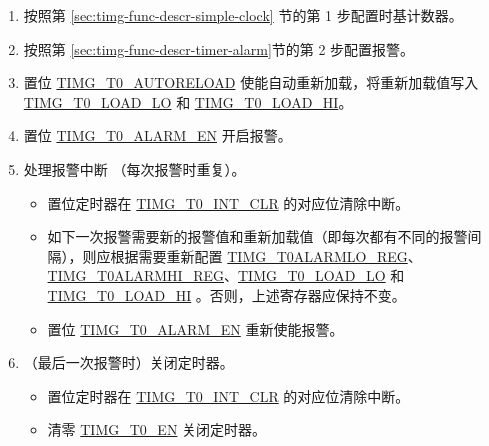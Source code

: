 \documentclass[main\_\_CN.tex]{subfiles}
\begin{document}
\begin{enumerate}
    \item 按照第 \ref{sec:timg-func-descr-simple-clock} 节的第 1 步配置时基计数器。
    \item 按照第 \ref{sec:timg-func-descr-timer-alarm}节的第 2 步配置报警。
    \item 置位 \hyperref[fielddesc:TIMGTXAUTORELOAD]{TIMG\_T0\_AUTORELOAD} 使能自动重新加载，将重新加载值写入 \hyperref[fielddesc:TIMGTXLOADLO]{TIMG\_T0\_LOAD\_LO} 和 \hyperref[fielddesc:TIMGTXLOADHI]{TIMG\_T0\_LOAD\_HI}。
    \item 置位 \hyperref[fielddesc:TIMGTXALARMEN]{TIMG\_T0\_ALARM\_EN} 开启报警。
    \item 处理报警中断 （每次报警时重复）。
    \begin{itemize}
        \item 置位定时器在 \hyperref[fielddesc:TIMGT0INTCLR]{TIMG\_T0\_INT\_CLR} 的对应位清除中断。
        \item 如下一次报警需要新的报警值和重新加载值（即每次都有不同的报警间隔），则应根据需要重新配置 \hyperref[regdesc:TIMGTXALARMLOREG]{TIMG\_T0ALARMLO\_REG}、\hyperref[regdesc:TIMGTXALARMHIREG]{TIMG\_T0ALARMHI\_REG}、\hyperref[fielddesc:TIMGTXLOADLO]{TIMG\_T0\_LOAD\_LO} 和 \hyperref[fielddesc:TIMGTXLOADHI]{TIMG\_T0\_LOAD\_HI} 。否则，上述寄存器应保持不变。
        \item 置位 \hyperref[fielddesc:TIMGTXALARMEN]{TIMG\_T0\_ALARM\_EN} 重新使能报警。
    \end{itemize}
    \item （最后一次报警时）关闭定时器。
    \begin{itemize}
        \item 置位定时器在 \hyperref[fielddesc:TIMGT0INTCLR]{TIMG\_T0\_INT\_CLR} 的对应位清除中断。
        \item 清零 \hyperref[fielddesc:TIMGTXEN]{TIMG\_T0\_EN} 关闭定时器。
    \end{itemize}
\end{enumerate}
\end{document}
